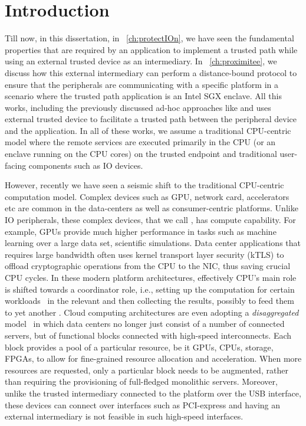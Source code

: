 \section{Introduction}
\label{sec: intro}


Till now, in this dissertation, in \protection~\ref{ch:protectIOn}, we have seen the fundamental properties that are required by an application to implement a trusted path while using an external trusted device as an intermediary. In \proximitee~\ref{ch:proximitee}, we  discuss how this external intermediary can perform a distance-bound protocol to ensure that the peripherals are communicating with a specific platform in a scenario where the trusted path application is an Intel SGX enclave. All this works, including the previously discussed ad-hoc approaches like \integrikey and \integriscreen uses external trusted device to facilitate a trusted path between the peripheral device and the application. In all of these works, we assume a traditional CPU-centric model where the remote services are executed primarily in the CPU (or an enclave running on the CPU cores) on the trusted endpoint and traditional user-facing components such as IO devices.

However, recently we have seen a seismic shift to the traditional CPU-centric computation model. Complex devices such as GPU, network card, accelerators etc are common in the data-centers as well as consumer-centric platforms. Unlike IO peripherals, these complex devices, that we call \sphw, has compute capability. For example, GPUs provide much higher performance in tasks such as machine learning over a large data set, scientific simulations. Data center applications that requires large bandwidth often uses kernel transport layer security (kTLS) to offload cryptographic operations from the CPU to the NIC, thus saving crucial CPU cycles. In these modern platform architectures, effectively CPU's main role is shifted towards a coordinator role, i.e., setting up the computation for certain workloads~\cite{spec_hw_acc} in the relevant \sphw and then collecting the results, possibly to feed them to yet another \sphw. Cloud computing architectures are even adopting a \emph{disaggregated} model~\cite{disaggregatedcomp} in which data centers no longer just consist of a number of connected servers, but of functional blocks connected with high-speed interconnects. Each block provides a pool of a particular resource, be it GPUs, CPUs, storage, FPGAs, to allow for fine-grained resource allocation and acceleration. When more resources are requested, only a particular block needs to be augmented, rather than requiring the provisioning of full-fledged monolithic servers. Moreover, unlike the trusted intermediary connected to the platform over the USB interface, these \sphw devices can connect over interfaces such as PCI-express and having an external intermediary is not feasible in such high-speed interfaces. 


